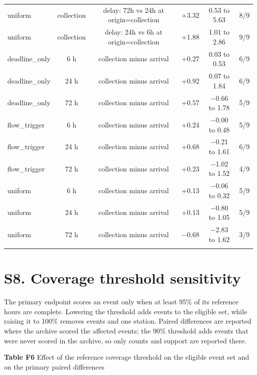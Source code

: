 \documentclass[lineno,pdflatex,sn-apa]{sn-jnl}%
\theoremstyle{thmstyleone}%
\theoremstyle{thmstyletwo}%
\theoremstyle{thmstylethree}%
\begin{document}
\begin{center}
\begin{tabular}{@{}lccccc@{}}
uniform & collection & delay: 72h vs 24h at origin=collection & +3.32 & 0.53 to 5.63 & 8/9\\
uniform & collection & delay: 24h vs 6h at origin=collection & +1.88 & 1.01 to 2.86 & 9/9\\
deadline\_only & 6 h & collection minus arrival & +0.27 & 0.03 to 0.53 & 6/9\\
deadline\_only & 24 h & collection minus arrival & +0.92 & 0.07 to 1.84 & 6/9\\
deadline\_only & 72 h & collection minus arrival & +0.57 & $-$0.66 to 1.78 & 5/9\\
flow\_trigger & 6 h & collection minus arrival & +0.24 & $-$0.00 to 0.48 & 5/9\\
flow\_trigger & 24 h & collection minus arrival & +0.68 & $-$0.21 to 1.61 & 6/9\\
flow\_trigger & 72 h & collection minus arrival & +0.23 & $-$1.02 to 1.52 & 4/9\\
uniform & 6 h & collection minus arrival & +0.13 & $-$0.06 to 0.32 & 5/9\\
uniform & 24 h & collection minus arrival & +0.13 & $-$0.80 to 1.05 & 5/9\\
uniform & 72 h & collection minus arrival & $-$0.68 & $-$2.83 to 1.62 & 3/9\\
\botrule
\end{tabular}
\end{center}

\section*{S8. Coverage threshold sensitivity}

The primary endpoint scores an event only when at least 95\% of its reference hours are complete. Lowering the threshold adds events to the eligible set, while raising it to 100\% removes events and one station. Paired differences are reported where the archive scored the affected events; the 90\% threshold adds events that were never scored in the archive, so only counts and support are reported there.

\begin{center}
\noindent\textbf{Table F6} Effect of the reference coverage threshold on the eligible event set and on the primary paired differences
\end{center}
\end{document}
